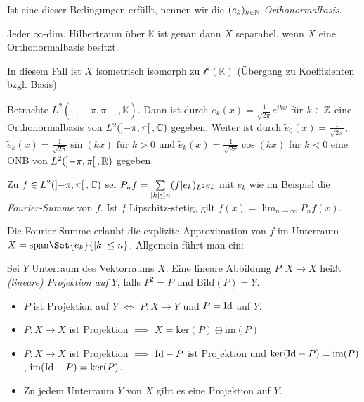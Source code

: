 \documentclass{cheat-sheet}
\newcommand{\K}{\mathbb{K}}
\begin{document}
\begin{definition}
  Ist eine dieser Bedingungen erfüllt, nennen wir die $(e_k)_{k \in \mathbb{N}}$ \emph{Orthonormalbasis}.
\end{definition}

\begin{satz}
  Jeder $\infty$-dim. Hilbertraum über $\K$ ist genau dann $X$ separabel, wenn $X$ eine Orthonormalbasis besitzt.
\end{satz}

\begin{bem}
  In diesem Fall ist $X$ isometrisch isomorph zu $\mathcal{l}^2(\K)$ (Übergang zu Koeffizienten bzgl. Basis)
\end{bem}



\begin{bsp}
  Betrachte $L^2(\left] -\pi, \pi \right[, \K)$. Dann ist durch $e_k(x) = \frac{1}{\sqrt{2\pi}} e^{ikx}$ für $k \in \mathbb{Z}$ eine Orthonormalbasis von $L^2(\left] -\pi, \pi \right[, \mathbb{C})$ gegeben. Weiter ist durch $\widetilde{e}_0(x) = \frac{1}{\sqrt{2\pi}}$, $\widetilde{e}_{k}(x) = \frac{1}{\sqrt{2\pi}} \sin(kx)$ für $k > 0$ und $\widetilde{e}_k(x) = \frac{1}{\sqrt{2 \pi}} \cos(kx)$ für $k < 0$ eine ONB von $L^2(\left] -\pi, \pi \right[, \mathbb{R})$ gegeben.
\end{bsp}


\begin{lem}
  Zu $f \in L^2(\left] -\pi, \pi \right[, \mathbb{C})$ sei $P_n f = \sum_{\abs{k} \leq n} (f | e_k)_{L^2} e_k$ mit $e_k$ wie im Beispiel die \emph{Fourier-Summe} von $f$. Ist $f$ Lipschitz-stetig, gilt $f(x) = \lim_{n \to \infty} P_n f(x)$.
\end{lem}


Die Fourier-Summe erlaubt die explizite Approximation von $f$ im Unterraum $X = \mathrm{span} \Set{e_k}{ \abs{k} \leq n }$. Allgemein führt man ein:

\begin{definition}
  Sei $Y$ Unterraum des Vektorraums $X$. Eine lineare Abbildung $P : X \to X$ heißt \emph{(lineare) Projektion auf $Y$}, falls $P^2 = P$ und $\mathrm{Bild}(P) = Y$.
\end{definition}

\begin{lem}
  \begin{itemize}
    \item $P$ ist Projektion auf $Y$ $\iff$ $P : X \to Y$ und $P = \mathrm{Id}$ auf $Y$.
    \item $P : X \to X$ ist Projektion $\implies$ $X = \mathrm{ker}(P) \oplus \mathrm{im}(P)$
    \item $P : X \to X$ ist Projektion $\implies$ $\mathrm{Id} - P$ ist Projektion und $\ker(\mathrm{Id} - P) = \mathrm{im}(P)$, $\mathrm{im}(\mathrm{Id} - P) = \mathrm{ker}(P)$.
    \item Zu jedem Unterraum $Y$ von $X$ gibt es eine Projektion auf $Y$.
  \end{itemize}
\end{lem}
\end{document}
